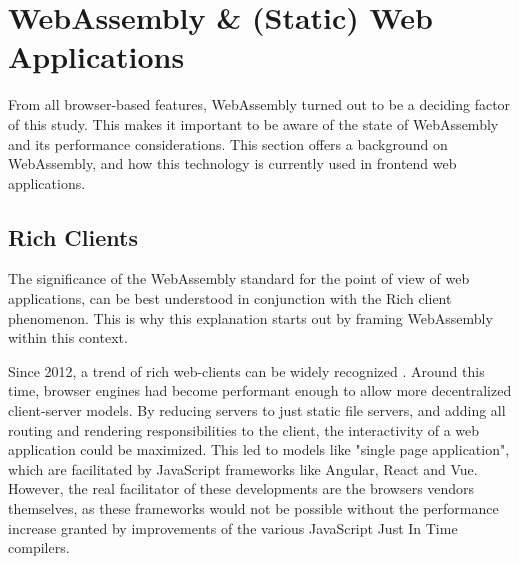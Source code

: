 


\section{WebAssembly \& (Static) Web Applications}
\label{sec:background-web}

From all browser-based features, WebAssembly turned out to be a deciding factor of this study. This makes it important to be aware of the state of WebAssembly and its performance considerations.
This section offers a background on WebAssembly, and how this technology is currently used in frontend web applications.

\subsection{Rich Clients}
\label{sec:background-web-rich}

The significance of the WebAssembly standard for the point of view of web applications, can be best understood in conjunction with the Rich client phenomenon. 
This is why this explanation starts out by framing WebAssembly within this context.




Since 2012, a trend of rich web-clients can be widely recognized \cite{hamilton_client-side_2014, panidi_hybrid_2015, kulawiak_analysis_2019}.
Around this time, browser engines had become performant enough to allow more decentralized client-server models.
By reducing servers to just static file servers, and adding all routing and rendering responsibilities to the client, the interactivity of a web application could be maximized. 
This led to models like "single page application", which are facilitated by JavaScript frameworks like Angular, React and Vue.
However, the real facilitator of these developments are the browsers vendors themselves, as these frameworks would not be possible without the performance increase granted by improvements of the various JavaScript Just In Time compilers. 

